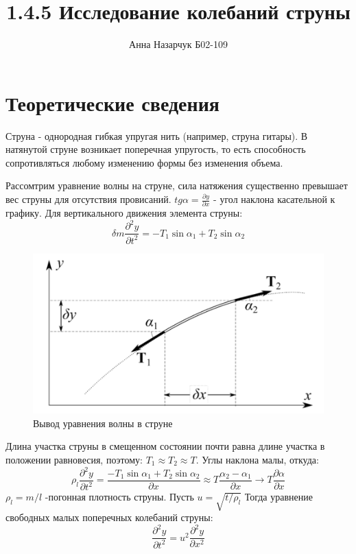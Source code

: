 \documentclass[a4paper,12pt]{article} %
\author{Анна Назарчук Б02-109}
\title{1.4.5 Исследование колебаний струны}
\date{}
\begin{document}
\maketitle
\section{Теоретические сведения}
Струна - однородная гибкая упругая нить (например, струна гитары). В натянутой струне возникает поперечная упругость, то есть способность сопротивляться любому изменению формы без изменения объема. 

Рассомтрим уравнение волны на струне, сила натяжения существенно превышает вес струны для отсутствия провисаний. $tg\alpha = \frac{\partial y}{\partial x}$ - угол наклона касательной к графику. Для вертикального движения элемента струны:
\begin{equation}
\delta m \frac{\partial ^ 2 y}{\partial t^2} = -T_1\sin \alpha_1 + T_2\sin \alpha_2
\end{equation}

\begin{figure}[h!]
\begin{center}
\includegraphics[width=1\textwidth]{Вывод}
\end{center}
\caption{Вывод уравнения волны в струне} \label{вывод}
\end{figure}

Длина участка струны в смещенном состоянии почти равна длине участка в положении равновесия, поэтому: $T_1\approx T_2\approx T$. Углы наклона малы, откуда:
\begin{equation}
\rho_l \frac{\partial ^ 2 y}{\partial t^2} = \frac{-T_1\sin \alpha_1 + T_2\sin \alpha_2}{\partial x} \approx T \frac{\alpha_2-\alpha_1}{\partial x}\to T \frac{\partial \alpha}{\partial x}
\end{equation}
$\rho_l = m/l$ -погонная плотность струны. Пусть $u = \sqrt{t/\rho_l}$
Тогда уравнение свободных малых поперечных колебаний
струны:
\begin{equation}
\frac{\partial ^ 2 y}{\partial t^2} = u^2\frac{\partial ^ 2 y}{\partial x^2}
\end{equation}
\end{document}

